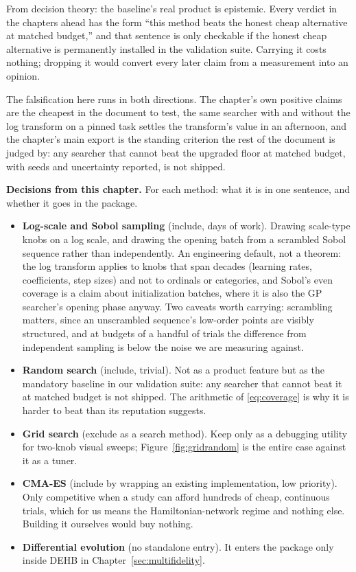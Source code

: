 From decision theory: the baseline's real product is epistemic. Every
verdict in the chapters ahead has the form ``this method beats the
honest cheap alternative at matched budget,'' and that sentence is
only checkable if the honest cheap alternative is permanently
installed in the validation suite. Carrying it costs nothing;
dropping it would convert every later claim from a measurement into
an opinion.

The falsification here runs in both directions. The chapter's own
positive claims are the cheapest in the document to test, the same
searcher with and without the log transform on a pinned task settles
the transform's value in an afternoon, and the chapter's main export
is the standing criterion the rest of the document is judged by: any
searcher that cannot beat the upgraded floor at matched budget, with
seeds and uncertainty reported, is not shipped.

\begin{decisions}
\noindent\textbf{Decisions from this chapter.} For each method: what it
is in one sentence, and whether it goes in the package.
\begin{itemize}[leftmargin=1.3em, itemsep=2pt]
\item \textbf{Log-scale and Sobol sampling} (include, days of work).
Drawing scale-type knobs on a log scale, and drawing the opening batch
from a scrambled Sobol sequence rather than independently. An
engineering default, not a theorem: the log transform applies to knobs
that span decades (learning rates, coefficients, step sizes) and not to
ordinals or categories, and Sobol's even coverage is a claim about
initialization batches, where it is also the GP searcher's opening
phase anyway. Two caveats worth carrying: scrambling matters, since an
unscrambled sequence's low-order points are visibly structured, and at
budgets of a handful of trials the difference from independent sampling
is below the noise we are measuring against.
\item \textbf{Random search} (include, trivial). Not as a product
feature but as the mandatory baseline in our validation suite: any
searcher that cannot beat it at matched budget is not shipped. The
arithmetic of \eqref{eq:coverage} is why it is harder to beat than its
reputation suggests.
\item \textbf{Grid search} (exclude as a search method). Keep only as a
debugging utility for two-knob visual sweeps; Figure~\ref{fig:gridrandom}
is the entire case against it as a tuner.
\item \textbf{CMA-ES} (include by wrapping an existing implementation,
low priority). Only competitive when a study can afford hundreds of
cheap, continuous trials, which for us means the Hamiltonian-network
regime and nothing else. Building it ourselves would buy nothing.
\item \textbf{Differential evolution} (no standalone entry). It enters
the package only inside DEHB in Chapter~\ref{sec:multifidelity}.
\end{itemize}
\end{decisions}

